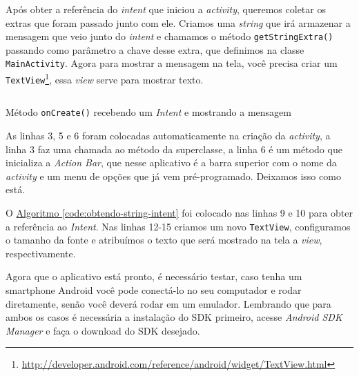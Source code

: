 \documentclass[a4paper,12pt,brazil,oneside]{book}
\begin{document}
\begin{singlespace}
Após obter a referência do \emph{intent} que iniciou a \emph{activity}, queremos coletar os extras que foram passado junto com ele. Criamos uma \emph{string} que irá armazenar a mensagem que veio junto do \emph{intent} e chamamos o método \texttt{getStringExtra()} passando como parâmetro a chave desse extra, que definimos na classe \texttt{MainActivity}. 
Agora para mostrar a mensagem na tela, você precisa criar um \texttt{TextView}\footnote{\href{http://developer.android.com/reference/android/widget/TextView.html}{http://developer.android.com/reference/android/widget/TextView.html}}, essa \emph{view} serve para mostrar texto. 

\begin{listing}[H]
\inputminted[linenos=true,fontsize=\small,frame=lines, framesep=2mm, tabsize=2,numbersep=5pt]{java}{src/firstapp/9.java}
\caption{Método \texttt{onCreate()} recebendo um \emph{Intent} e mostrando a mensagem}
\end{listing}

As linhas 3, 5 e 6 foram colocadas automaticamente na criação da \emph{activity}, a linha 3 faz uma chamada ao método da superclasse, a linha 6 é um método que inicializa a \emph{Action Bar}, que nesse aplicativo é a barra superior com o nome da \emph{activity} e um menu de opções que já vem pré-programado. Deixamos isso como está.

O \hyperref[code:obtendo-string-intent]{Algoritmo \ref*{code:obtendo-string-intent}} foi colocado nas linhas 9 e 10 para obter a referência ao \emph{Intent}. Nas linhas 12-15 criamos um novo \texttt{TextView}, configuramos o tamanho da fonte e atribuímos o texto que será mostrado na tela a \emph{view}, respectivamente. 

\newpage

Agora que o aplicativo está pronto, é necessário testar, caso tenha um smartphone Android você pode conectá-lo no seu computador e rodar diretamente, senão você deverá rodar em um emulador. Lembrando que para ambos os casos é necessária a instalação do SDK primeiro, acesse \emph{Android SDK Manager} e faça o download do SDK desejado.


\end{singlespace}
\end{document}

